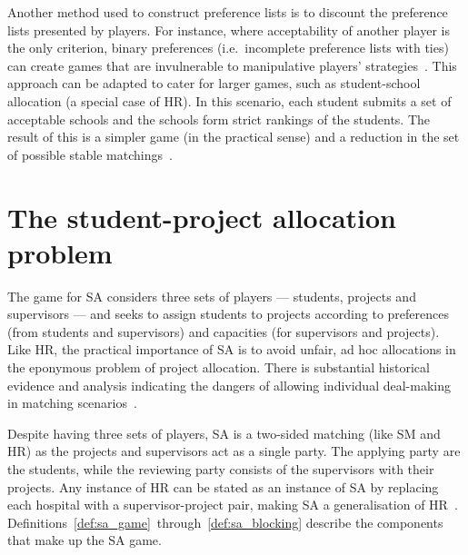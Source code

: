 Another method used to construct preference lists is to discount the preference
lists presented by players. For instance, where acceptability of another player
is the only criterion, binary preferences (i.e.\ incomplete preference lists
with ties) can create games that are invulnerable to manipulative players'
strategies~\cite{Bogomolnaia2004}. This approach can be adapted to cater for
larger games, such as student-school allocation (a special case of HR). In this
scenario, each student submits a set of acceptable schools and the schools form
strict rankings of the students. The result of this is a simpler game (in the
practical sense) and a reduction in the set of possible stable
matchings~\cite{Haeringer2014,Haeringer2019}.


\section{The student-project allocation problem}

The game for SA considers three sets of players --- students, projects and
supervisors --- and seeks to assign students to projects according to
preferences (from students and supervisors) and capacities (for supervisors and
projects). Like HR, the practical importance of SA is to avoid unfair, ad hoc
allocations in the eponymous problem of project allocation. There is substantial
historical evidence and analysis indicating the dangers of allowing individual
deal-making in matching scenarios~\cite{Gusfield1989,Roth1984,Roth1992}.

Despite having three sets of players, SA is a two-sided matching (like SM and
HR) as the projects and supervisors act as a single party. The applying party
are the students, while the reviewing party consists of the supervisors with
their projects. Any instance of HR can be stated as an instance of SA by
replacing each hospital with a supervisor-project pair, making SA a
generalisation of HR~\cite{Abraham2003}.
Definitions~\ref{def:sa_game}~through~\ref{def:sa_blocking} describe the
components that make up the SA game.

